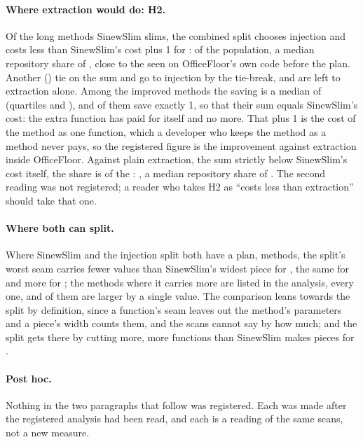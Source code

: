 \documentclass[11pt,a4paper]{article}
\newcommand{\Htwo}{H2}
\begin{document}
\paragraph{Where extraction would do: \Htwo{}.} Of the \nSlims{} long
methods SinewSlim slims, the combined split chooses injection and costs less
than SinewSlim's cost plus 1 for \nImproved{}: \ciImproved{} of the
population, a median repository share of \medianImproved{}, close to the
\priorImprovedShare{} seen on OfficeFloor's own code before the plan. Another
\nTied{} (\popTied{}) tie on the sum and go to injection by the tie-break,
and \notImprovedShare{} are left to extraction alone. Among the improved
methods the saving is a median of \savingMedian{} (quartiles \savingQone{}
and \savingQthree{}), and \savingOneShare{} of them save exactly 1, so that
their sum equals SinewSlim's cost: the extra function has paid for itself and
no more. That plus 1 is the cost of the method as one function, which a
developer who keeps the method as a method never pays, so the registered
figure is the improvement against extraction inside OfficeFloor. Against
plain extraction, the sum strictly below SinewSlim's cost itself, the share
is \nImprovedStrict{} of the \nSlims{}: \ciImprovedStrict{}, a median
repository share of \medianImprovedStrict{}. The second reading was not
registered; a reader who takes \Htwo{} as ``costs less than extraction''
should take that one.

\paragraph{Where both can split.} Where SinewSlim and the injection split
both have a plan, \nBoth{} methods, the split's worst seam carries fewer
values than SinewSlim's widest piece for \splitSmallerSeam{}, the same for
\equalSeam{} and more for \splitLargerSeam{}; the \nWorse{} methods where it
carries more are listed in the analysis, every one, and \worseByOneShare{} of
them are larger by a single value. The comparison leans towards the split by
definition, since a function's seam leaves out the method's parameters and a
piece's width counts them, and the scans cannot say by how much; and the
split gets there by cutting more, more functions than SinewSlim makes pieces
for \splitLargerParts{}.

\paragraph{Post hoc.} Nothing in the two paragraphs that follow was
registered. Each was made after the registered analysis had been read, and
each is a reading of the same scans, not a new measure.
\end{document}

